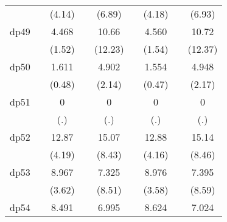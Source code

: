 {\begin{tabular}{l*{8}{c}}
            &                     &      (4.14)         &                     &      (6.89)         &                     &      (4.18)         &                     &      (6.93)         \\
[1em]
dp49        &                     &       4.468         &                     &       10.66\sym{***}&                     &       4.560         &                     &       10.72\sym{***}\\
            &                     &      (1.52)         &                     &     (12.23)         &                     &      (1.54)         &                     &     (12.37)         \\
[1em]
dp50        &                     &       1.611         &                     &       4.902\sym{*}  &                     &       1.554         &                     &       4.948\sym{*}  \\
            &                     &      (0.48)         &                     &      (2.14)         &                     &      (0.47)         &                     &      (2.17)         \\
[1em]
dp51        &                     &           0         &                     &           0         &                     &           0         &                     &           0         \\
            &                     &         (.)         &                     &         (.)         &                     &         (.)         &                     &         (.)         \\
[1em]
dp52        &                     &       12.87\sym{***}&                     &       15.07\sym{***}&                     &       12.88\sym{***}&                     &       15.14\sym{***}\\
            &                     &      (4.19)         &                     &      (8.43)         &                     &      (4.16)         &                     &      (8.46)         \\
[1em]
dp53        &                     &       8.967\sym{***}&                     &       7.325\sym{***}&                     &       8.976\sym{***}&                     &       7.395\sym{***}\\
            &                     &      (3.62)         &                     &      (8.51)         &                     &      (3.58)         &                     &      (8.59)         \\
[1em]
dp54        &                     &       8.491\sym{***}&                     &       6.995\sym{***}&                     &       8.624\sym{***}&                     &       7.024\sym{***}\\

\end{tabular}}
